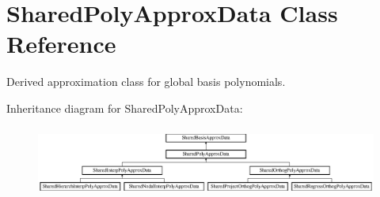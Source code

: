 \section{Shared\+Poly\+Approx\+Data Class Reference}
\label{classPecos_1_1SharedPolyApproxData}


Derived approximation class for global basis polynomials.  


Inheritance diagram for Shared\+Poly\+Approx\+Data\+:\begin{figure}[H]
\begin{center}
\leavevmode
\includegraphics[height=2.352941cm]{classPecos_1_1SharedPolyApproxData}
\end{center}
\end{figure}
